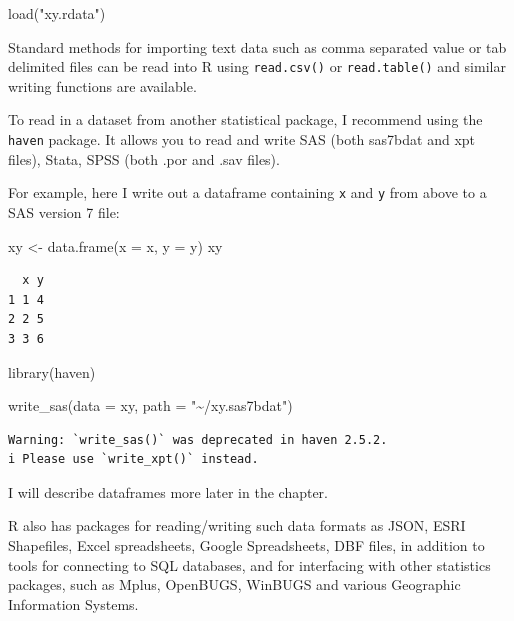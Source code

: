 \documentclass[
  letterpaper,
  DIV=11,
  numbers=noendperiod]{scrreprt}
\newenvironment{Shaded}{\begin{snugshade}}{\end{snugshade}}
\newcommand{\AttributeTok}[1]{\textcolor[rgb]{0.40,0.45,0.13}{#1}}
\newcommand{\FunctionTok}[1]{\textcolor[rgb]{0.28,0.35,0.67}{#1}}
\newcommand{\NormalTok}[1]{\textcolor[rgb]{0.00,0.23,0.31}{#1}}
\newcommand{\OtherTok}[1]{\textcolor[rgb]{0.00,0.23,0.31}{#1}}
\newcommand{\StringTok}[1]{\textcolor[rgb]{0.13,0.47,0.30}{#1}}
\begin{document}
\begin{Shaded}
\begin{Highlighting}[]
\FunctionTok{load}\NormalTok{(}\StringTok{"xy.rdata"}\NormalTok{)}
\end{Highlighting}
\end{Shaded}

Standard methods for importing text data such as comma separated value
or tab delimited files can be read into R using \texttt{read.csv()} or
\texttt{read.table()} and similar writing functions are available.

To read in a dataset from another statistical package, I recommend using
the \texttt{haven} package. It allows you to read and write SAS (both
sas7bdat and xpt files), Stata, SPSS (both .por and .sav files).

For example, here I write out a dataframe containing \texttt{x} and
\texttt{y} from above to a SAS version 7 file:

\begin{Shaded}
\begin{Highlighting}[]
\NormalTok{xy }\OtherTok{\textless{}{-}} \FunctionTok{data.frame}\NormalTok{(}\AttributeTok{x =}\NormalTok{ x, }\AttributeTok{y =}\NormalTok{ y)}
\NormalTok{xy}
\end{Highlighting}
\end{Shaded}

\begin{verbatim}
  x y
1 1 4
2 2 5
3 3 6
\end{verbatim}

\begin{Shaded}
\begin{Highlighting}[]
\FunctionTok{library}\NormalTok{(haven)}

\FunctionTok{write\_sas}\NormalTok{(}\AttributeTok{data =}\NormalTok{ xy,}
          \AttributeTok{path =} \StringTok{"\textasciitilde{}/xy.sas7bdat"}\NormalTok{)}
\end{Highlighting}
\end{Shaded}

\begin{verbatim}
Warning: `write_sas()` was deprecated in haven 2.5.2.
i Please use `write_xpt()` instead.
\end{verbatim}

I will describe dataframes more later in the chapter.

R also has packages for reading/writing such data formats as JSON, ESRI
Shapefiles, Excel spreadsheets, Google Spreadsheets, DBF files, in
addition to tools for connecting to SQL databases, and for interfacing
with other statistics packages, such as Mplus, OpenBUGS, WinBUGS and
various Geographic Information Systems.
\end{document}
